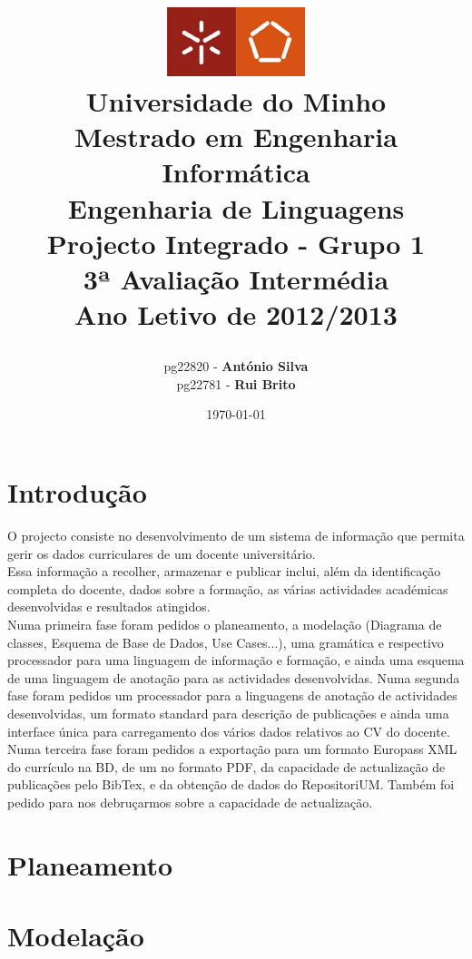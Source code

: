 \documentclass[a4paper,11pt,openright,openbib]{article}
\title{
	\large{\includegraphics[width=0.3\textwidth]{../../report-template/UM.jpg}} \\
	\large{Universidade do Minho}  \\
	\large{Mestrado em Engenharia Informática}  \\
	\large{Engenharia de Linguagens}  \\
	\large{Projecto Integrado - Grupo 1}  \\	
	\large{\textbf{3ª Avaliação Intermédia}} \\
	\large{Ano Letivo de 2012/2013} \\
	\date{\today}
}
\author{	
	\begin{tabular}[t]{c c}      
        pg22820 - \textbf{António Silva} \\        
	pg22781 - \textbf{Rui Brito} \\   				
	\\ 
	\end{tabular}
}
\begin{document}
\maketitle


\pagestyle{headings}
\newpage
\tableofcontents
\newpage

\section{Introdução}
O projecto consiste no desenvolvimento de um sistema de informação que permita gerir os dados curriculares de um docente universitário.\\
Essa informação a recolher, armazenar e publicar inclui, além da identificação completa do docente, dados sobre a formação, as várias actividades académicas desenvolvidas e resultados atingidos.\\
Numa primeira fase foram pedidos o planeamento, a modelação (Diagrama de classes, Esquema de Base de Dados, Use Cases...), uma gramática e respectivo processador para uma linguagem de informação e formação, e ainda uma esquema de uma linguagem de anotação para as actividades desenvolvidas.
Numa segunda fase foram pedidos um processador para a linguagens de anotação de actividades desenvolvidas, um formato standard para descrição de publicações e ainda uma interface única para carregamento dos vários dados relativos ao CV do docente.
Numa terceira fase foram pedidos a exportação para um formato Europass XML do currículo na BD, de um no formato PDF, da capacidade de actualização de publicações pelo BibTex, e da obtenção de dados do RepositoriUM. Também foi pedido para nos debruçarmos sobre a capacidade de actualização.

\section{Planeamento}

\section{Modelação}
\end{document}
